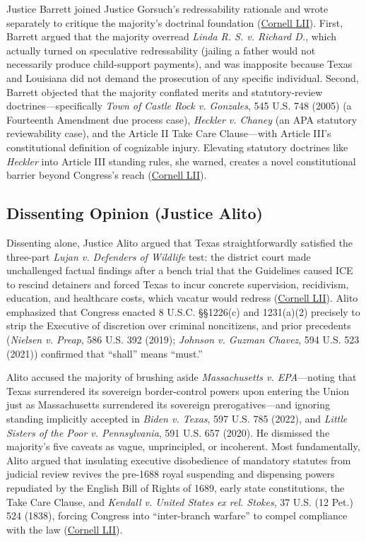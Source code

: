 \documentclass[12pt]{article}
\begin{document}
Justice Barrett joined Justice Gorsuch's redressability rationale and wrote separately to critique the majority's doctrinal foundation (\href{https://www.law.cornell.edu/supremecourt/text/22-58}{Cornell LII}). First, Barrett argued that the majority overread \textit{Linda R. S. v. Richard D.}, which actually turned on speculative redressability (jailing a father would not necessarily produce child-support payments), and was inapposite because Texas and Louisiana did not demand the prosecution of any specific individual. Second, Barrett objected that the majority conflated merits and statutory-review doctrines---specifically \textit{Town of Castle Rock v. Gonzales}, 545 U.S. 748 (2005) (a Fourteenth Amendment due process case), \textit{Heckler v. Chaney} (an APA statutory reviewability case), and the Article II Take Care Clause---with Article III's constitutional definition of cognizable injury. Elevating statutory doctrines like \textit{Heckler} into Article III standing rules, she warned, creates a novel constitutional barrier beyond Congress's reach (\href{https://www.law.cornell.edu/supremecourt/text/22-58}{Cornell LII}).

\subsection{Dissenting Opinion (Justice Alito)}

Dissenting alone, Justice Alito argued that Texas straightforwardly satisfied the three-part \textit{Lujan v. Defenders of Wildlife} test: the district court made unchallenged factual findings after a bench trial that the Guidelines caused ICE to rescind detainers and forced Texas to incur concrete supervision, recidivism, education, and healthcare costs, which vacatur would redress (\href{https://www.law.cornell.edu/supremecourt/text/22-58}{Cornell LII}). Alito emphasized that Congress enacted 8 U.S.C. \S\S 1226(c) and 1231(a)(2) precisely to strip the Executive of discretion over criminal noncitizens, and prior precedents (\textit{Nielsen v. Preap}, 586 U.S. 392 (2019); \textit{Johnson v. Guzman Chavez}, 594 U.S. 523 (2021)) confirmed that ``shall'' means ``must.''

Alito accused the majority of brushing aside \textit{Massachusetts v. EPA}---noting that Texas surrendered its sovereign border-control powers upon entering the Union just as Massachusetts surrendered its sovereign prerogatives---and ignoring standing implicitly accepted in \textit{Biden v. Texas}, 597 U.S. 785 (2022), and \textit{Little Sisters of the Poor v. Pennsylvania}, 591 U.S. 657 (2020). He dismissed the majority's five caveats as vague, unprincipled, or incoherent. Most fundamentally, Alito argued that insulating executive disobedience of mandatory statutes from judicial review revives the pre-1688 royal suspending and dispensing powers repudiated by the English Bill of Rights of 1689, early state constitutions, the Take Care Clause, and \textit{Kendall v. United States ex rel. Stokes}, 37 U.S. (12 Pet.) 524 (1838), forcing Congress into ``inter-branch warfare'' to compel compliance with the law (\href{https://www.law.cornell.edu/supremecourt/text/22-58}{Cornell LII}).
\end{document}
